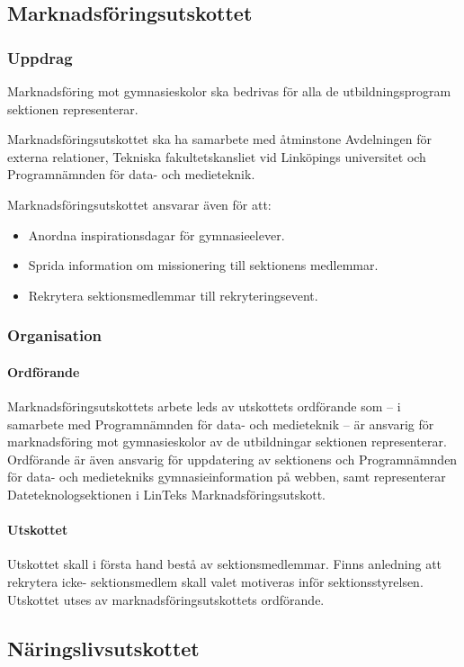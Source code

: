 \documentclass{datateknologsektionen-document}
\begin{document}
\subsection{Marknadsföringsutskottet}
\label{mafu}
\subsubsection{Uppdrag}
Marknadsföring mot gymnasieskolor ska bedrivas för alla de utbildningsprogram
sektionen representerar.

Marknadsföringsutskottet ska ha samarbete med åtminstone Avdelningen för externa relationer,
Tekniska fakultetskansliet vid Linköpings universitet och Programnämnden för data- och
medieteknik.

Marknadsföringsutskottet ansvarar även för att:
\begin{itemize}
  \item Anordna inspirationsdagar för gymnasieelever.
  \item Sprida information om missionering till sektionens medlemmar.
  \item Rekrytera sektionsmedlemmar till rekryteringsevent.
\end{itemize}
\subsubsection{Organisation}
\paragraph{Ordförande}
Marknadsföringsutskottets arbete leds av utskottets ordförande som – i samarbete med
Programnämnden för data- och medieteknik – är ansvarig för marknadsföring mot
gymnasieskolor av de utbildningar sektionen representerar. Ordförande är även
ansvarig för uppdatering av sektionens och Programnämnden för data- och medietekniks
gymnasieinformation på webben, samt representerar Dateteknologsektionen i LinTeks Marknadsföringsutskott.

\paragraph{Utskottet}

Utskottet skall i första hand bestå av sektionsmedlemmar. Finns anledning att rekrytera icke-
sektionsmedlem skall valet motiveras inför sektionsstyrelsen. Utskottet utses av
marknadsföringsutskottets ordförande.

\subsection{Näringslivsutskottet}
\label{naru}
\end{document}
